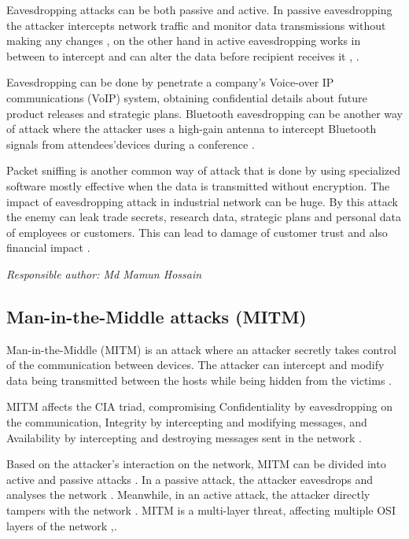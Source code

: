 \documentclass[conference]{IEEEtran}
\begin{document}
Eavesdropping attacks can be both passive and active. In passive eavesdropping the attacker intercepts network traffic and monitor data transmissions without making any changes , on the other hand in active eavesdropping works in between to intercept and can alter the data before recipient receives it \cite{b4}, \cite{b5}. 

Eavesdropping can be done by penetrate a company’s  Voice-over IP communications (VoIP) system, obtaining confidential details about future product releases and  strategic plans. Bluetooth eavesdropping can be another way of attack where the attacker uses a high-gain antenna to intercept Bluetooth signals from attendees’devices during a conference \cite{b5}. 

Packet sniffing is another common way of attack that is done by using specialized software mostly effective when the data is transmitted without encryption. The impact of eavesdropping attack in industrial network can be huge. By this attack the enemy can leak trade secrets, research data, strategic plans and personal data of employees or customers. This can lead to damage of customer trust and also financial impact \cite{b5}.

\textit{Responsible author: Md Mamun Hossain}
\subsection{Man-in-the-Middle attacks (MITM)}
Man-in-the-Middle (MITM) is an attack where an attacker secretly takes control of the communication between devices.  The attacker can intercept and modify data being transmitted between the hosts while being hidden from the victims \cite{b6}. 

MITM affects the CIA triad, compromising Confidentiality by eavesdropping on the communication, Integrity by intercepting and modifying messages, and Availability by intercepting and destroying messages sent in the network \cite{b6}. 

Based on the attacker’s interaction on the network, MITM can be divided into active and passive attacks \cite{b7}. In a passive attack, the attacker eavesdrops and analyses the network \cite{b7}. Meanwhile, in an active attack, the attacker directly tampers with the network \cite{b7}. MITM is a multi-layer threat, affecting multiple OSI layers of the network \cite{b6},\cite{b7}.
\end{document}
